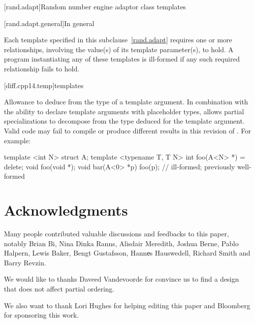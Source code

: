 \documentclass{wg21}
\begin{document}
[rand.adapt]{Random number engine adaptor class templates}

[rand.adapt.general]{In general}

\pnum
Each template specified in this subclause~\ref{rand.adapt}
requires one or more relationships,
involving the value(s) of its  template parameter(s), to hold.
A program instantiating any of these templates
is ill-formed
if any such required relationship fails to hold.



[diff.cpp14.temp]{templates}

\change
Allowance to deduce from the type of a  template argument.
\rationale
In combination with the ability to declare
 template arguments with placeholder types,
allows partial specializations to decompose
from the type deduced for the  template argument.
\effect
Valid \CppXIV{} code may fail to compile
or produce different results in this revision of \Cpp{}.
For example:
\begin{codeblock}
    template <int N> struct A;
    template <typename T, T N> int foo(A<N> *) = delete;
    void foo(void *);
    void bar(A<0> *p) {
        foo(p);           // ill-formed; previously well-formed
    }
\end{codeblock}


\section{Acknowledgments}
Many people contributed valuable discussions and feedbacks to this paper, notably
Brian Bi, Nina Dinka Ranns, Alisdair Meredith, Joshua Berne, Pablo Halpern, Lewis Baker, Bengt Gustafsson,
Hannеs Hauswedell, Richard Smith and Barry Revzin.

We would like to thanks Daveed Vandevoorde for convince us to find a design that does not affect partial ordering.

We also want to thank Lori Hughes for helping editing this paper and Bloomberg for sponsoring this work.






\renewcommand{\section}[2]{}%

\begin{thebibliography}{9}


\end{thebibliography}
\end{document}
